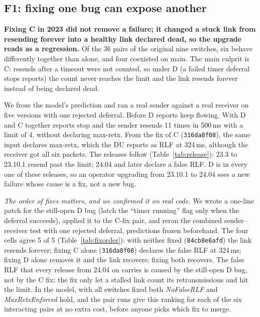 \documentclass[sigconf,10pt]{acmart}
\newcommand{\sw}[1]{\textsf{\small #1}}
\newcommand{\prop}[1]{\textit{#1}}
\newcommand{\commit}[1]{\texttt{\small #1}}
\begin{document}
\subsection{F1: fixing one bug can expose another}

\textbf{Fixing \sw{C} in 2023 did not remove a failure; it changed a
stuck link from resending forever into a healthy link declared dead, so
the upgrade reads as a regression.}
Of the 36 pairs of the original nine switches, six behave differently
together than alone, and four coexisted on main. The main culprit is
\sw{C}: resends after a timeout were not counted, so under \sw{D} (a
failed timer deferral stops reports) the count never reaches the limit
and the link resends forever instead of being declared dead.

We froze the model's prediction and ran a real sender against a real
receiver on five versions with one rejected deferral. Before \sw{D}
reports keep flowing. With \sw{D} and \sw{C} together reports stop and the
sender resends 11 times in 500\,ms with a limit of 4, without declaring
max-retx. From the fix of \sw{C} (\commit{316da8f08}), the same input
declares max-retx, which the DU reports as RLF at 324\,ms, although the
receiver got all six packets. The releases follow (Table~\ref{tab:release}):
23.3 to 23.10.1 resend past the limit; 24.04 and later declare a false
RLF. \sw{D} is in every one of these releases, so an operator upgrading
from 23.10.1 to 24.04 sees a new failure whose cause is a fix, not a new
bug.

\emph{The order of fixes matters, and we confirmed it on real code.} We
wrote a one-line patch for the still-open \sw{D} bug (latch the
``timer running'' flag only when the deferral succeeds), applied it to
the C-fix pair, and reran the combined sender--receiver test with one
rejected deferral, predictions frozen beforehand. The four cells agree
5 of 5 (Table~\ref{tab:fixorder}): with neither fixed
(\commit{84cb8e6afd}) the link resends forever; fixing \sw{C} alone
(\commit{316da8f08}) declares the false RLF at 324\,ms; fixing \sw{D}
alone removes it and the link recovers; fixing both recovers. The false
RLF that every release from 24.04 on carries is caused by the still-open
\sw{D} bug, not by the \sw{C} fix: the fix only let a stalled link count
its retransmissions and hit the limit. In the model, with all switches
fixed both \prop{NoFalseRLF} and \prop{MaxRetxEnforced} hold, and the
pair runs give this ranking for each of the six interacting pairs at no
extra cost, before anyone picks which fix to merge.
\end{document}
